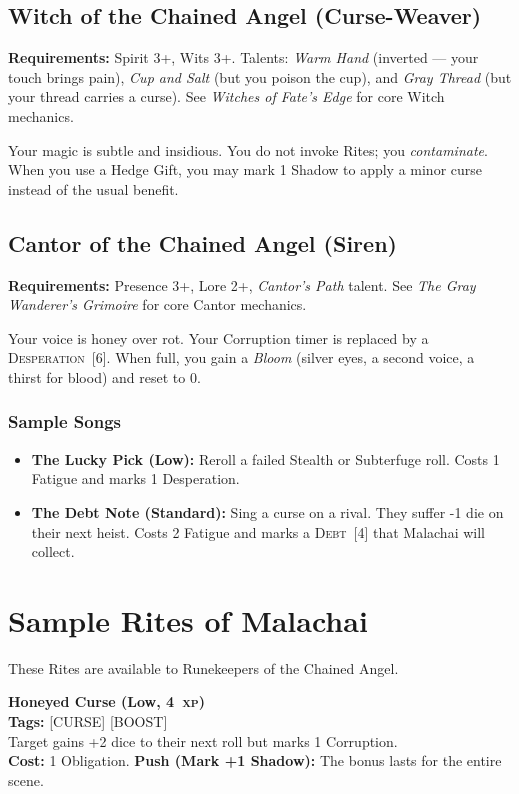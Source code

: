 \documentclass[10pt,twoside]{book}
\newcommand{\xp}[1]{#1~\textsc{xp}}
\newcommand{\timer}[2]{\textsc{#1}~[#2]}
\begin{document}
\section{Witch of the Chained Angel (Curse-Weaver)}

\textbf{Requirements:} Spirit 3+, Wits 3+. Talents: \textit{Warm Hand} (inverted --- your touch brings pain), \textit{Cup and Salt} (but you poison the cup), and \textit{Gray Thread} (but your thread carries a curse). See \textit{Witches of Fate's Edge} for core Witch mechanics.

Your magic is subtle and insidious. You do not invoke Rites; you \textit{contaminate}. When you use a Hedge Gift, you may mark 1 Shadow to apply a minor curse instead of the usual benefit.

\section{Cantor of the Chained Angel (Siren)}

\textbf{Requirements:} Presence 3+, Lore 2+, \textit{Cantor's Path} talent. See \textit{The Gray Wanderer's Grimoire} for core Cantor mechanics.

Your voice is honey over rot. Your Corruption timer is replaced by a \timer{Desperation}{6}. When full, you gain a \textit{Bloom} (silver eyes, a second voice, a thirst for blood) and reset to 0.

\subsection*{Sample Songs}
\begin{itemize}
\item \textbf{The Lucky Pick (Low):} Reroll a failed Stealth or Subterfuge roll. Costs 1 Fatigue and marks 1 Desperation.
\item \textbf{The Debt Note (Standard):} Sing a curse on a rival. They suffer -1 die on their next heist. Costs 2 Fatigue and marks a \timer{Debt}{4} that Malachai will collect.
\end{itemize}

\chapter{Sample Rites of Malachai}

These Rites are available to Runekeepers of the Chained Angel.

\begin{ritestat}
\textbf{Honeyed Curse (Low, \xp{4})} \\
\textbf{Tags:} [CURSE] [BOOST] \\
Target gains +2 dice to their next roll but marks 1 Corruption. \\
\textbf{Cost:} 1 Obligation. \textbf{Push (Mark +1 Shadow):} The bonus lasts for the entire scene.
\end{ritestat}
\end{document}
